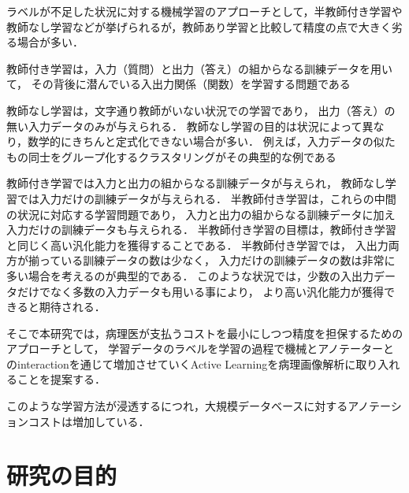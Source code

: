 ラベルが不足した状況に対する機械学習のアプローチとして，半教師付き学習や教師なし学習などが挙げられるが，教師あり学習と比較して精度の点で大きく劣る場合が多い．

教師付き学習は，入力（質問）と出力（答え）の組からなる訓練データを用いて， その背後に潜んでいる入出力関係（関数）を学習する問題である

教師なし学習は，文字通り教師がいない状況での学習であり， 出力（答え）の無い入力データのみが与えられる． 教師なし学習の目的は状況によって異なり，数学的にきちんと定式化できない場合が多い． 例えば，入力データの似たもの同士をグループ化するクラスタリングがその典型的な例である

教師付き学習では入力と出力の組からなる訓練データが与えられ， 教師なし学習では入力だけの訓練データが与えられる． 半教師付き学習は，これらの中間の状況に対応する学習問題であり， 入力と出力の組からなる訓練データに加え入力だけの訓練データも与えられる． 半教師付き学習の目標は，教師付き学習と同じく高い汎化能力を獲得することである． 
半教師付き学習では， 入出力両方が揃っている訓練データの数は少なく， 入力だけの訓練データの数は非常に多い場合を考えるのが典型的である． このような状況では，少数の入出力データだけでなく多数の入力データも用いる事により， より高い汎化能力が獲得できると期待される．

そこで本研究では，病理医が支払うコストを最小にしつつ精度を担保するためのアプローチとして，
学習データのラベルを学習の過程で機械とアノテーターとのinteractionを通じて増加させていくActive Learningを病理画像解析に取り入れることを提案する．




このような学習方法が浸透するにつれ，大規模データベースに対するアノテーションコストは増加している．


\section{研究の目的}




